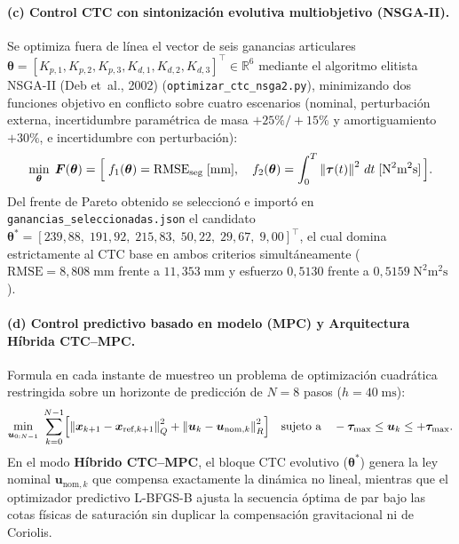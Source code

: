 \documentclass[11pt,a4paper]{article}
\newcommand{\Real}{\mathbb{R}}
\newcommand{\T}{^{\!\top}}
\newcommand{\norm}[1]{\left\lVert#1\right\rVert}
\begin{document}
\paragraph{(c) Control CTC con sintonización evolutiva multiobjetivo (NSGA-II).}
Se optimiza fuera de línea el vector de seis ganancias articulares $\bm{\theta}=[K_{p,1},K_{p,2},K_{p,3},K_{d,1},K_{d,2},K_{d,3}]\T\in\Real^{6}$ mediante el algoritmo elitista NSGA-II (Deb et~al., 2002) (\texttt{optimizar\_ctc\_nsga2.py}), minimizando dos funciones objetivo en conflicto sobre cuatro escenarios (nominal, perturbación externa, incertidumbre paramétrica de masa $+25\%/+15\%$ y amortiguamiento $+30\%$, e incertidumbre con perturbación):
\begin{equation}\label{eq:nsga2_obj}
\min_{\bm{\theta}}\;\bm{F}(\bm{\theta})=\Bigl[\;f_{1}(\bm{\theta})=\text{RMSE}_{\text{seg}}\;[\text{mm}],\quad f_{2}(\bm{\theta})=\int_{0}^{T}\norm{\bm{\tau}(t)}^{2}\,dt\;[\text{N}^{2}\text{m}^{2}\text{s}]\,\Bigr].
\end{equation}
Del frente de Pareto obtenido se seleccionó e importó en \texttt{ganancias\_seleccionadas.json} el candidato $\bm{\theta}^{*}=[239{,}88,\;191{,}92,\;215{,}83,\;50{,}22,\;29{,}67,\;9{,}00]\T$, el cual domina estrictamente al CTC base en ambos criterios simultáneamente ($\text{RMSE}=8{,}808\;\text{mm}$ frente a $11{,}353\;\text{mm}$ y esfuerzo $0{,}5130$ frente a $0{,}5159\;\text{N}^{2}\text{m}^{2}\text{s}$).

\paragraph{(d) Control predictivo basado en modelo (MPC) y Arquitectura Híbrida CTC--MPC.}
Formula en cada instante de muestreo un problema de optimización cuadrática restringida sobre un horizonte de predicción de $N=8$ pasos ($h=40\;\text{ms}$):
\begin{equation}\label{eq:mpc}
\min_{\bm{u}_{0:N-1}}\;\sum_{k=0}^{N-1}\Bigl[\norm{\bm{x}_{k+1}-\bm{x}_{\text{ref},k+1}}_{Q}^{2}+\norm{\bm{u}_{k}-\bm{u}_{\text{nom},k}}_{R}^{2}\Bigr]\quad\text{sujeto a}\quad -\bm{\tau}_{\max}\le\bm{u}_{k}\le+\bm{\tau}_{\max}.
\end{equation}
En el modo \textbf{Híbrido CTC--MPC}, el bloque CTC evolutivo ($\bm{\theta}^{*}$) genera la ley nominal $\bm{u}_{\text{nom},k}$ que compensa exactamente la dinámica no lineal, mientras que el optimizador predictivo L-BFGS-B ajusta la secuencia óptima de par bajo las cotas físicas de saturación sin duplicar la compensación gravitacional ni de Coriolis.
\end{document}
